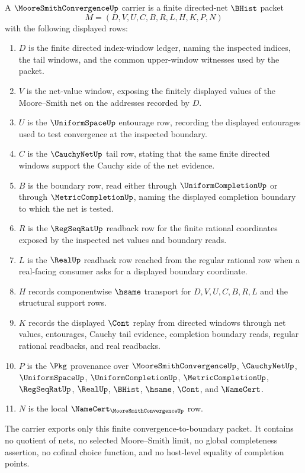 \begin{definition}
\label{def:moore-smith-convergence-carrier}
A $\MooreSmithConvergenceUp$ carrier is a finite directed-net $\BHist$ packet
$$
M=(D,V,U,C,B,R,L,H,K,P,N)
$$
with the following displayed rows:
\begin{enumerate}
\item $D$ is the finite directed index-window ledger, naming the inspected indices, the tail windows, and the common upper-window witnesses used by the packet.
\item $V$ is the net-value window, exposing the finitely displayed values of the Moore--Smith net on the addresses recorded by $D$.
\item $U$ is the $\UniformSpaceUp$ entourage row, recording the displayed entourages used to test convergence at the inspected boundary.
\item $C$ is the $\CauchyNetUp$ tail row, stating that the same finite directed windows support the Cauchy side of the net evidence.
\item $B$ is the boundary row, read either through $\UniformCompletionUp$ or through $\MetricCompletionUp$, naming the displayed completion boundary to which the net is tested.
\item $R$ is the $\RegSeqRatUp$ readback row for the finite rational coordinates exposed by the inspected net values and boundary reads.
\item $L$ is the $\RealUp$ readback row reached from the regular rational row when a real-facing consumer asks for a displayed boundary coordinate.
\item $H$ records componentwise $\hsame$ transport for $D,V,U,C,B,R,L$ and the structural support rows.
\item $K$ records the displayed $\Cont$ replay from directed windows through net values, entourages, Cauchy tail evidence, completion boundary reads, regular rational readbacks, and real readbacks.
\item $P$ is the $\Pkg$ provenance over $\MooreSmithConvergenceUp$, $\CauchyNetUp$, $\UniformSpaceUp$, $\UniformCompletionUp$, $\MetricCompletionUp$, $\RegSeqRatUp$, $\RealUp$, $\BHist$, $\hsame$, $\Cont$, and $\NameCert$.
\item $N$ is the local $\NameCert_{\MooreSmithConvergenceUp}$ row.
\end{enumerate}
The carrier exports only this finite convergence-to-boundary packet. It contains no quotient of nets, no selected Moore--Smith limit, no global completeness assertion, no cofinal choice function, and no host-level equality of completion points.
\end{definition}

